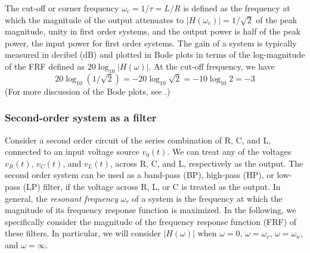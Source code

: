 The cut-off or corner frequency $\omega_c=1/\tau=L/R$ is defined as
the frequency at which the magnitude of the output attenuates to 
$|H(\omega_c)|=1/\sqrt{2}$ of the peak magnitude, unity in first 
order systems, and the output power is half of the peak power, 
the input power for first order systems. The gain of a system is
typically measured in decibel (dB) and plotted in Bode plots in 
terms of the log-magnitude of the FRF defined as $ 20 \log_{10}|H(\omega)|$. 
At the cut-off frequency, we have
\[
20 \log_{10}(1/\sqrt{2})=-20\log_{10}\sqrt{2}=-10\log_{10}2=-3
\]
(For more discussion of the Bode plots, see
.)



\subsubsection*{Second-order system as a filter}

Consider a second order circuit of the series combination of R, C, 
and L, connected to an input voltage source $v_0(t)$. We can treat 
any of the voltages $v_R(t)$, $v_C(t)$, and $v_L(t)$, across R, C, 
and L, respectively as the output. The second order system can be 
used as a band-pass (BP), high-pass (HP), or low-pass (LP) filter, 
if the voltage across R, L, or C is treated as the output. In general, 
the {\em resonant frequency} $\omega_r$ of a system is the frequency 
at which the magnitude of its frequency response function is maximized. 
In the following, we specifically consider the magnitude of the 
frequency response function (FRF) of these filters. In particular,
we will consider $|H(\omega)|$ when $\omega=0$, $\omega=\omega_r$, 
$\omega=\omega_n$, and $\omega=\infty$.

